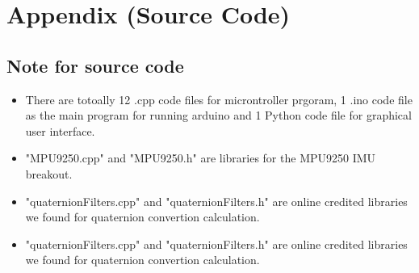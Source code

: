 \newpage
\section{Appendix (Source Code)}

	\subsection{Note for source code}
	\begin{itemize}
		\item {There are totoally 12 .cpp code files for microntroller prgoram, 1 .ino code file as the main program for running arduino and 1 Python code file for graphical user interface. }
		
		\item {"MPU9250.cpp" and "MPU9250.h" are libraries for the MPU9250 IMU breakout.}

		\item {"quaternionFilters.cpp" and "quaternionFilters.h" are online credited libraries we found for quaternion convertion calculation.}

		\item {"quaternionFilters.cpp" and "quaternionFilters.h" are online credited libraries we found for quaternion convertion calculation.}
	\end{itemize}

